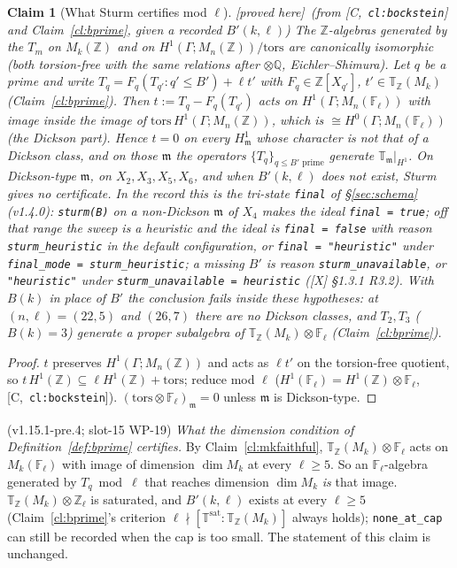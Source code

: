 \documentclass[11pt]{article}
\newtheorem{claim}[theorem]{Claim}
\theoremstyle{remark}
\newcommand{\F}{\mathbb{F}}
\newcommand{\Z}{\mathbb{Z}}
\newcommand{\Q}{\mathbb{Q}}
\newcommand{\Ga}{\Gamma}
\newcommand{\Fl}{\F_\ell}
\newcommand{\T}{\mathbb{T}}
\newcommand{\m}{\mathfrak{m}}
\newcommand{\Mn}{M_n}
\newcommand{\HA}[1]{[C,~\texttt{#1}]}      %
\newcommand{\PROVED}{\textsf{[proved here]}}
\begin{document}
\begin{claim}[What Sturm certifies mod $\ell$]\label{cl:sturmmodl}\PROVED\ (from \HA{cl:bockstein} and Claim~\ref{cl:bprime}, given a recorded $B'(k,\ell)$)
The $\Z$-algebras generated by the $T_m$ on $M_k(\Z)$ and on $H^1(\Ga;\Mn(\Z))/\mathrm{tors}$
are canonically isomorphic (both torsion-free with the same relations after $\otimes\Q$,
Eichler--Shimura). Let $q$ be a prime and write $T_q=F_q(T_{q'}:q'\le B')+\ell t'$ with
$F_q\in\Z[X_{q'}]$, $t'\in\T_\Z(M_k)$ (Claim~\ref{cl:bprime}). Then $t:=T_q-F_q(T_{q'})$ acts on
$H^1(\Ga;\Mn(\Fl))$ with image inside the image of $\mathrm{tors}\,H^1(\Ga;\Mn(\Z))$, which is
$\cong H^0(\Ga;\Mn(\Fl))$ (the Dickson part). Hence $t=0$ on every $H^1_\m$ whose character is
not that of a Dickson class, and on those $\m$ the operators $\{T_q\}_{q\le B'\text{ prime}}$
generate $\T_\m|_{H^1}$. On Dickson-type $\m$, on $X_2,X_3,X_5,X_6$, and when $B'(k,\ell)$ does
not exist, Sturm gives no certificate. In the record this is the tri-state \texttt{final} of
\S\ref{sec:schema} (v1.4.0): \texttt{sturm(B\textquotesingle)} on a non-Dickson $\m$ of $X_4$
makes the ideal \texttt{final = true}; off that range the sweep is a heuristic and the ideal is
\texttt{final = false} with reason \texttt{sturm\_heuristic} in the default configuration, or
\texttt{final = "heuristic"} under \texttt{final\_mode = sturm\_heuristic}; a missing $B'$ is
reason \texttt{sturm\_unavailable}, or \texttt{"heuristic"} under
\texttt{sturm\_unavailable = heuristic} ([X] \S1.3.1 R3.2). With $B(k)$ in place of $B'$ the conclusion fails inside
these hypotheses: at $(n,\ell)=(22,5)$ and $(26,7)$ there are no Dickson classes, and $T_2,T_3$
($B(k)=3$) generate a proper subalgebra of $\T_\Z(M_k)\otimes\Fl$ (Claim~\ref{cl:bprime}).
\end{claim}
\begin{proof}
$t$ preserves $H^1(\Ga;\Mn(\Z))$ and acts as $\ell t'$ on the torsion-free quotient, so
$t\,H^1(\Z)\subseteq\ell H^1(\Z)+\mathrm{tors}$; reduce mod $\ell$
($H^1(\Fl)=H^1(\Z)\otimes\Fl$, \HA{cl:bockstein}). $(\mathrm{tors}\otimes\Fl)_\m=0$ unless
$\m$ is Dickson-type.
\end{proof}

\noindent
(v1.15.1-pre.4; slot-15 WP-19) \emph{What the dimension condition of Definition~\ref{def:bprime} certifies.} By
Claim~\ref{cl:mkfaithful}, $\T_\Z(M_k)\otimes\Fl$ acts on $M_k(\Fl)$ with image of dimension $\dim M_k$ at every $\ell\ge5$.
So an $\Fl$-algebra generated by $T_q\bmod\ell$ that reaches dimension $\dim M_k$ \emph{is} that image. $\T_\Z(M_k)\otimes\Z_\ell$ is
saturated, and $B'(k,\ell)$ exists at every $\ell\ge5$ (Claim~\ref{cl:bprime}'s criterion
$\ell\nmid[\T^{\mathrm{sat}}:\T_\Z(M_k)]$ always holds); \texttt{none\_at\_cap} can still be recorded when the cap is too small.
The statement of this claim is unchanged.
\end{document}
